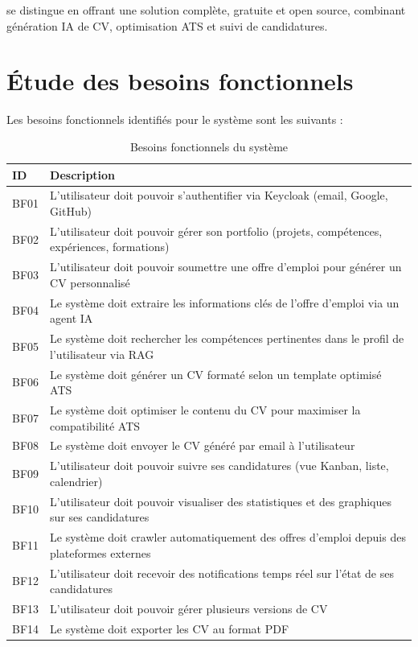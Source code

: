 \projectname{} se distingue en offrant une solution complète, gratuite et open source, combinant génération IA de CV, optimisation ATS et suivi de candidatures.

\section{Étude des besoins fonctionnels}
\label{sec:analyse:fonctionnels}

Les besoins fonctionnels identifiés pour le système \projectname{} sont les suivants :

\begin{table}[H]
\centering
\caption{Besoins fonctionnels du système}
\label{tab:besoins-fonctionnels}
\begin{tabularx}{\textwidth}{lX}
\toprule
\textbf{ID} & \textbf{Description} \\
\midrule
BF01 & L'utilisateur doit pouvoir s'authentifier via Keycloak (email, Google, GitHub) \\
BF02 & L'utilisateur doit pouvoir gérer son portfolio (projets, compétences, expériences, formations) \\
BF03 & L'utilisateur doit pouvoir soumettre une offre d'emploi pour générer un CV personnalisé \\
BF04 & Le système doit extraire les informations clés de l'offre d'emploi via un agent IA \\
BF05 & Le système doit rechercher les compétences pertinentes dans le profil de l'utilisateur via RAG \\
BF06 & Le système doit générer un CV formaté selon un template optimisé ATS \\
BF07 & Le système doit optimiser le contenu du CV pour maximiser la compatibilité ATS \\
BF08 & Le système doit envoyer le CV généré par email à l'utilisateur \\
BF09 & L'utilisateur doit pouvoir suivre ses candidatures (vue Kanban, liste, calendrier) \\
BF10 & L'utilisateur doit pouvoir visualiser des statistiques et des graphiques sur ses candidatures \\
BF11 & Le système doit crawler automatiquement des offres d'emploi depuis des plateformes externes \\
BF12 & L'utilisateur doit recevoir des notifications temps réel sur l'état de ses candidatures \\
BF13 & L'utilisateur doit pouvoir gérer plusieurs versions de CV \\
BF14 & Le système doit exporter les CV au format PDF \\
\bottomrule
\end{tabularx}
\end{table}

